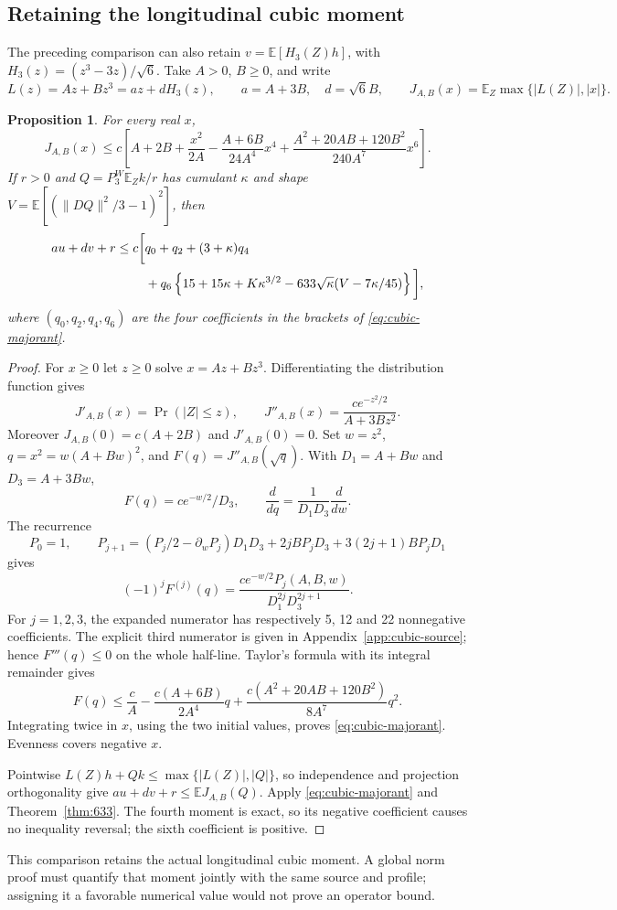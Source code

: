 \documentclass[11pt]{article}
\newcommand{\E}{\mathbb E}
\newtheorem{proposition}[theorem]{Proposition}
\begin{document}
\subsection{Retaining the longitudinal cubic moment}
The preceding comparison can also retain
$v=\E[H_3(Z)h]$, with $H_3(z)=(z^3-3z)/\sqrt6$.
Take $A>0$, $B\ge0$, and write
\[
 L(z)=Az+Bz^3=az+dH_3(z),\qquad a=A+3B,\quad d=\sqrt6B,
 \qquad J_{A,B}(x)=\E_Z\max\{|L(Z)|,|x|\}.
\]
\begin{proposition}\label{prop:cubic-source}
For every real $x$,
\begin{equation}\label{eq:cubic-majorant}
 J_{A,B}(x)\le c\left[
 A+2B+\frac{x^2}{2A}-\frac{A+6B}{24A^4}x^4
 +\frac{A^2+20AB+120B^2}{240A^7}x^6\right].
\end{equation}
If $r>0$ and $Q=P_3^W\E_Zk/r$ has cumulant $\kappa$ and shape
$V=\E[(\|DQ\|^2/3-1)^2]$, then
\begin{align}\label{eq:cubic-source-price}
 au+dv+r\le c\bigg[&q_0+q_2+(3+\kappa)q_4\notag\\
 &+q_6\left\{15+15\kappa+K\kappa^{3/2}
 -633\sqrt\kappa(V-7\kappa/45)\right\}\bigg],
\end{align}
where $(q_0,q_2,q_4,q_6)$ are the four coefficients in the brackets
of \eqref{eq:cubic-majorant}.
\end{proposition}
\begin{proof}
For $x\ge0$ let $z\ge0$ solve $x=Az+Bz^3$.
Differentiating the distribution function gives
\[
 J'_{A,B}(x)=\Pr(|Z|\le z),\qquad
 J''_{A,B}(x)=\frac{ce^{-z^2/2}}{A+3Bz^2}.
\]
Moreover $J_{A,B}(0)=c(A+2B)$ and $J'_{A,B}(0)=0$.
Set $w=z^2$, $q=x^2=w(A+Bw)^2$, and
$F(q)=J''_{A,B}(\sqrt q)$. With $D_1=A+Bw$ and $D_3=A+3Bw$,
\[
 F(q)=ce^{-w/2}/D_3,\qquad
 \frac d{dq}=\frac1{D_1D_3}\frac d{dw}.
\]
The recurrence
\[
 P_0=1,\qquad
 P_{j+1}=(P_j/2-\partial_wP_j)D_1D_3
 +2jBP_jD_3+3(2j+1)BP_jD_1
\]
gives
\[
 (-1)^jF^{(j)}(q)=
 \frac{ce^{-w/2}P_j(A,B,w)}{D_1^{2j}D_3^{2j+1}}.
\]
For $j=1,2,3$, the expanded numerator has respectively 5, 12 and
22 nonnegative coefficients. The explicit third numerator is given in
Appendix~\ref{app:cubic-source}; hence $F'''(q)\le0$ on the whole
half-line. Taylor's formula with its integral remainder gives
\[
 F(q)\le\frac cA-\frac{c(A+6B)}{2A^4}q
 +\frac{c(A^2+20AB+120B^2)}{8A^7}q^2.
\]
Integrating twice in $x$, using the two initial values, proves
\eqref{eq:cubic-majorant}. Evenness covers negative $x$.

Pointwise $L(Z)h+Qk\le\max\{|L(Z)|,|Q|\}$, so independence and
projection orthogonality give $au+dv+r\le\E J_{A,B}(Q)$.
Apply \eqref{eq:cubic-majorant} and Theorem~\ref{thm:633}.
The fourth moment is exact, so its negative coefficient causes no
inequality reversal; the sixth coefficient is positive.
\end{proof}
This comparison retains the actual longitudinal cubic moment.
A global norm proof must quantify that moment jointly with the same
source and profile; assigning it a favorable numerical value would not
prove an operator bound.
\end{document}
